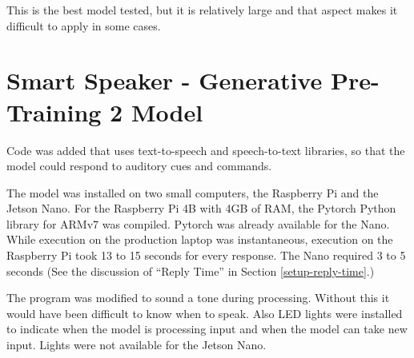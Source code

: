 This is the best model tested, but it is relatively large and that aspect makes it difficult to apply in some cases.

\section{Smart Speaker - Generative Pre-Training 2 Model}

\label{install-gpt2-smart}
Code was added that uses text-to-speech and speech-to-text libraries, so that the model could respond to auditory cues and commands.

The model was installed on two small computers, the Raspberry Pi and the Jetson Nano. For the Raspberry Pi 4B with 4GB of RAM, the Pytorch Python library for ARMv7 was compiled. Pytorch was already available for the Nano. %
While execution on the production laptop was instantaneous, execution on the Raspberry Pi took 13 to 15 seconds for every response. The Nano required 3 to 5 seconds (See the discussion of ``Reply Time'' in Section \ref{setup-reply-time}.)

The program was modified to sound a tone during processing. Without this it would have been difficult to know when to speak. Also LED lights were installed to indicate when the model is processing input and when the model can take new input. Lights were not available for the Jetson Nano. 
